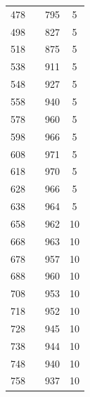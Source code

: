 \documentclass[a4paper,12pt]{article} %
\begin{document}
\begin{table}[H]
\begin{tabular}{|c|c|c|c|}
				478       &                     & 795     & 5              \\ \cline{1-1} \cline{3-4} 
				498       &                     & 827     & 5              \\ \cline{1-1} \cline{3-4} 
				518       &                     & 875     & 5              \\ \cline{1-1} \cline{3-4} 
				538       &                     & 911     & 5              \\ \cline{1-1} \cline{3-4} 
				548       &                     & 927     & 5              \\ \cline{1-1} \cline{3-4} 
				558       &                     & 940     & 5              \\ \cline{1-1} \cline{3-4} 
				578       &                     & 960     & 5              \\ \cline{1-1} \cline{3-4} 
				598       &                     & 966     & 5              \\ \cline{1-1} \cline{3-4} 
				608       &                     & 971     & 5              \\ \cline{1-1} \cline{3-4} 
				618       &                     & 970     & 5              \\ \cline{1-1} \cline{3-4} 
				628       &                     & 966     & 5              \\ \cline{1-1} \cline{3-4} 
				638       &                     & 964     & 5              \\ \cline{1-1} \cline{3-4} 
				658       &                     & 962     & 10             \\ \cline{1-1} \cline{3-4} 
				668       &                     & 963     & 10             \\ \cline{1-1} \cline{3-4} 
				678       &                     & 957     & 10             \\ \cline{1-1} \cline{3-4} 
				688       &                     & 960     & 10             \\ \cline{1-1} \cline{3-4} 
				708       &                     & 953     & 10             \\ \cline{1-1} \cline{3-4} 
				718       &                     & 952     & 10             \\ \cline{1-1} \cline{3-4} 
				728       &                     & 945     & 10             \\ \cline{1-1} \cline{3-4} 
				738       &                     & 944     & 10             \\ \cline{1-1} \cline{3-4} 
				748       &                     & 940     & 10             \\ \cline{1-1} \cline{3-4} 
				758       &                     & 937     & 10             \\ \hline
			\end{tabular}
		\end{table}
	
\end{document}

